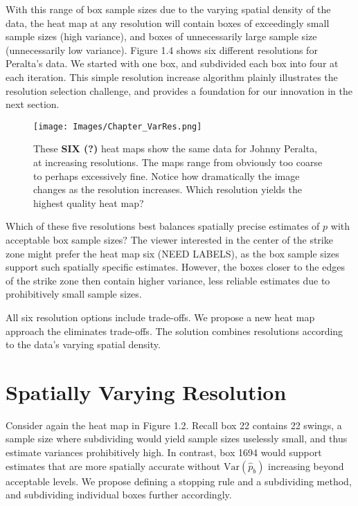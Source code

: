 With this range of box sample sizes due to the varying spatial density of the data, the heat map at any resolution will contain boxes of exceedingly small sample sizes (high variance), and boxes of unnecessarily large sample size (unnecessarily low variance). Figure 1.4 shows six different resolutions for Peralta's data. We started with one box, and subdivided each box into four at each iteration. This simple resolution increase algorithm plainly illustrates the resolution selection challenge, and provides a foundation for our innovation in the next section. 
        \begin{figure}[H]
      	\centering
      	\texttt{[image: Images/Chapter\_VarRes.png]} 
      	\caption{These {\bf SIX (?)} heat maps show the same data for Johnny Peralta, at increasing resolutions. The maps range from obviously too coarse to perhaps excessively fine. Notice how dramatically the image changes as the resolution increases. Which resolution yields the highest quality heat map?}
      	\end{figure} 
Which of these five resolutions best balances spatially precise estimates of $p$ with acceptable box sample sizes? The viewer interested in the center of the strike zone might prefer the heat map six (NEED LABELS), as the box sample sizes support such spatially specific estimates. However, the boxes closer to the edges of the strike zone then contain higher variance, less reliable estimates due to prohibitively small sample sizes. 

All six resolution options include trade-offs. We propose a new heat map approach the eliminates trade-offs. The solution combines resolutions according to the data's varying spatial density.

\section{Spatially Varying Resolution} %

Consider again the heat map in Figure 1.2. Recall box 22 contains 22 swings, a sample size where subdividing would yield sample sizes uselessly small, and thus estimate variances prohibitively high. In contrast, box 1694 would support estimates that are more spatially accurate without $\text{Var}(\hat{p}_{b})$ increasing beyond acceptable levels. We propose defining a stopping rule and a subdividing method, and subdividing individual boxes further accordingly. 

